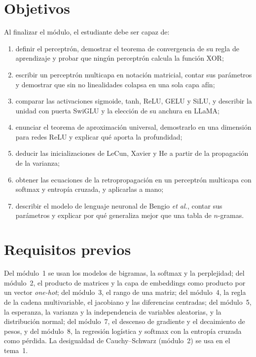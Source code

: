 \documentclass[11pt,a4paper,twoside,openany]{book}
\begin{document}
\section*{Objetivos}
Al finalizar el módulo, el estudiante debe ser capaz de:
\begin{enumerate}[label=\arabic*.]
  \item definir el perceptrón, demostrar el teorema de convergencia de su regla de aprendizaje y probar que ningún perceptrón calcula la función XOR;
  \item escribir un perceptrón multicapa en notación matricial, contar sus parámetros y demostrar que sin no linealidades colapsa en una sola capa afín;
  \item comparar las activaciones sigmoide, tanh, ReLU, GELU y SiLU, y describir la unidad con puerta SwiGLU y la elección de su anchura en LLaMA;
  \item enunciar el teorema de aproximación universal, demostrarlo en una dimensión para redes ReLU y explicar qué aporta la profundidad;
  \item deducir las inicializaciones de LeCun, Xavier y He a partir de la propagación de la varianza;
  \item obtener las ecuaciones de la retropropagación en un perceptrón multicapa con softmax y entropía cruzada, y aplicarlas a mano;
  \item describir el modelo de lenguaje neuronal de Bengio \emph{et al.}, contar sus parámetros y explicar por qué generaliza mejor que una tabla de $n$-gramas.
\end{enumerate}

\section*{Requisitos previos}
Del módulo~1 se usan los modelos de bigramas, la softmax y la perplejidad; del módulo~2, el producto de matrices y la capa de embeddings como producto por un vector \emph{one-hot}; del módulo~3, el rango de una matriz; del módulo~4, la regla de la cadena multivariable, el jacobiano y las diferencias centradas; del módulo~5, la esperanza, la varianza y la independencia de variables aleatorias, y la distribución normal; del módulo~7, el descenso de gradiente y el decaimiento de pesos, y del módulo~8, la regresión logística y softmax con la entropía cruzada como pérdida. La desigualdad de Cauchy--Schwarz (módulo~2) se usa en el tema~1.
\end{document}
